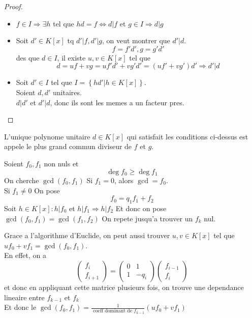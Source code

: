 \documentclass[../main.tex]{subfiles}
\begin{document}
\begin{proof}
\begin{itemize}
\item $f \in I \Rightarrow \exists h $ tel que $hd =f \iff d |f$ et  $g \in I \Rightarrow  d| g$ 
\item Soit $d' \in K[x]$ tq $d' | f, d'|g$, on veut montrer que $d' |d$.
	\[ 
	f = f' d', g=g'd'
	\]
	des que $d \in I$, il existe $u,v \in K[x]$ tel que
	\[ 
	d = uf + vg = uf'd' + vg'd' = ( uf'+vg' ) d' \Rightarrow d' | d
	\]
	

\item Soit $d' \in I$ tel que $I = \left\{ hd' | h \in K[x] \right\} $.\\
	Soient $d,d'$ unitaires.\\
	$d| d'$ et $d'| d$, donc ils sont les memes a un facteur pres.
	
\end{itemize}

\end{proof}
\begin{defn}[PGCD]
	L'unique polynome unitaire $d \in K[x]$ qui satisfait les conditions ci-dessus est appele le plus grand commun diviseur de $f$ et $g$.
\end{defn}
\begin{thm}
	Soient $f_0, f_1$ non nuls et 
	\[ 
	\deg f_0 \geq \deg f_1
	\]
	On cherche $\gcd( f_0,f_1) $ 
	Si $f_1=0$, alors $\gcd = f_0$.\\
	Si $f_1 \neq 0$ 
	On pose 
	\[ 
		f_{0} = q_1 f_1 + f_2 
	\]
	Soit $h \in K[x]: h | f_0 $ et $h| f_1 \Rightarrow  h | f_2$ 
	Et donc on pose $\gcd( f_0,f_1) = \gcd( f_1,f_{2}) $
	On repete jusqu'a trouver un $f_k$ nul.
	
\end{thm}
Grace a l'algorithme d'Euclide, on peut aussi trouver $u,v \in K[x]$ tel que $uf_0 + vf_1 = \gcd( f_0, f_1) $.\\
En effet, on a
\[ 
\begin{pmatrix}
f_i\\ f_{i+1} 
\end{pmatrix}
=
\begin{pmatrix}
	0 & 1\\
	1 & - q_i
\end{pmatrix}
\begin{pmatrix}
f_{i-1} \\
f_i
\end{pmatrix}
\]
et donc en appliquant cette matrice plusieurs fois, on trouve une dependance lineaire entre $f_{k-1} $ et $f_k$ \\
Et donc le $\gcd( f_0, f_1)  = \frac{1}{ \text{ coeff dominant de } f_{k-1} } ( uf_0 + v f_1) $
\end{document}
